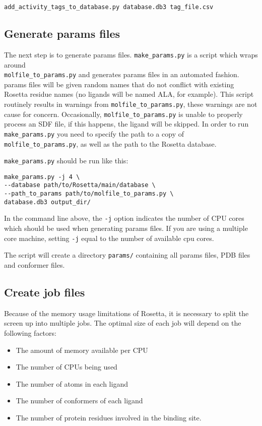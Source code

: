 \begin{verbatim}
add_activity_tags_to_database.py database.db3 tag_file.csv
\end{verbatim}

\subsection{Generate params files}

The next step is to generate params files. \texttt{make\_params.py} is a script which wraps around\\
\texttt{molfile\_to\_params.py} and generates params files in an automated fashion.
params files will be given random names that do not conflict with existing Rosetta residue names (no ligands will be named ALA, for example).
This script routinely results in warnings from \texttt{molfile\_to\_params.py}, these warnings are not cause for concern. 
Occasionally, \texttt{molfile\_to\_params.py} is unable to properly process an \ac{SDF} file, if this happens, the ligand will be skipped. 
In order to run \texttt{make\_params.py} you need to specify the path to a copy of \texttt{molfile\_to\_params.py}, as well as the path to the Rosetta database.

\texttt{make\_params.py} should be run like this:

\singlespace
\begin{verbatim}
make_params.py -j 4 \
--database path/to/Rosetta/main/database \
--path_to_params path/to/molfile_to_params.py \
database.db3 output_dir/
\end{verbatim}
\doublespace

In the command line above, the \texttt{-j} option indicates the number of \ac{CPU} cores which should be used when generating params files.
If you are using a multiple core machine, setting \texttt{-j} equal to the number of available cpu cores.

The script will create a directory \texttt{params/} containing all params files, \ac{PDB} files and conformer files.

\subsection{Create job files}

Because of the memory usage limitations of Rosetta, it is necessary to split the screen up into multiple jobs. 
The optimal size of each job will depend on the following factors:

\begin{itemize}
\item The amount of memory available per \ac{CPU}
\item The number of \ac{CPU}s being used
\item The number of atoms in each ligand
\item The number of conformers of each ligand
\item The number of protein residues involved in the binding site.
\end{itemize}

